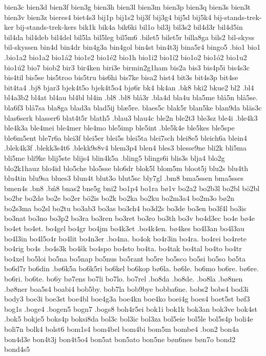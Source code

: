 bien3c
bien3d
bien3f
bien3g
bien3h
bien3l
bien3m
bien3p
bien3q
bien3s
bien3t
bien3v
bien3z
bieres4
biet4s3
bij1p
bij1s2
bij3f
bij3g4
bij5d
bij5k4
bij-stands-trek-ker
bij-stands-trek-kers
bik1k
bik4a
bik6ki
bil1o
bil3j
bil3s2
bil4d3r
bil4d5in
bil4da
bil4deb
bil4del
bil5la
bil5leg
bil5m6
.bilet5
bilet5r
billa8ga
bils2
bil-skyss
bil-skyssen
bin4d
bin4dr
bin4g3a
bin4gol
bin4st
bin4t3j
bina5r4
bingo5
.bio1
bio1
.bio1a2
bio1a2
bio1á2
bio1e2
bio1é2
bio1h
bio1i2
bio1í2
bio1o2
bio1ó2
bio1u2
bio1ú2
bio7
biob2
bir3
bir4ken
biri3e
birmin2g1ham
bis2a
bis3
bis4p5i
bis4s3c
bis4til
bis5se
bis5troo
bis5tru
bis6hi
bis7ke
bisa2
bist4
bit3s
bit4s3p
bit4se
bit4ta4
.bj8
bjar3
bjek4t5o
bjek4t5o4
bjø6r
bk4
bk4an
.bk8
bki2
bkue2
bl2
.bl4
bl4a3b2
bl4at
bl4au
bl4bl
bl4in
.bl8
.bł8
blå3r
.bla4d
bla4u
bla5me
blå5n
blå5se.
bla6f3
blå7sa
bla8ga
blad3a
blad5ij
blæ5re.
blaes5c
blak5r
blan5ke
blan9da
bläs3c
blas6serk
blasser6
blat4t5r
blath5
.blau3
blau4c
ble2n
ble2t3
ble3sz
ble4i
.ble4k3
ble4k3a
ble4mei
ble4mer
ble4mo
ble5imp
ble5int
.ble5k4e
ble5kes
ble5spe
ble6m5ent
ble7r6a
blei3f
blei5er
blei5s
blei5ta
blei7sch
blei8e5
bleich6a
blein4
.blek4k3f
.blekk3s4t6
.blekk9s8v4
blem3p4
blen4
bles3
blesse9ne
bli2k
bli5ma
bli5me
bli9ke
blij5ste
blijs4
blin4k5a
.bling5
blings6i
blis3s
blja4
blo2g
blo2k1hauz
blo4id
blo5che
blo5sse
blo6dr
blok5l
blom5m
bloot5j
blu2s
blu4th
blu4tin
blu9sa
blues3
blun4t
blut3o
blut5sc
bly7gl
.bm8
bma5ssen
bma5sses
bmen4s
.bn8
.bń8
bnas2
bne5g
bni2
bo1p4
bo1ra
bø1v
bo2a2
bo2b3l
bo2bl
bö2bl
bo2br
bo2dø
bo2e
bo2er
bö2is
bo2k
bo2ka
bo2ku
bo2m3a4
bo2m3o
bø2n
bo2s3ma
bo2sl
bo2tu
bo3ab3
bo3as
bo3ch4
bo3d2s
bo3de
bo3en
bo3f4l
bo3is
bo3nat
bo3no
bo3p2
bo3ra
bo3ren
bo3ret
bo3ro
bo3th
bo3v
bo4d3ec
bo4e
bø4e
bo4et
bo4et.
bo4gel
bo4gr
bo4jm
bo4k3et
.bo4k4en.
bø4kes
bo4l3an
bo4l3au
bo4l3in
bo4l5o4r
bo4lit
bo4n3er
.bo4na.
bo4ok
bo4r3in
bo4ra.
bo4rei
bo4rete
bo4rig
bo4s
.bo4s3k
bo4šk
bo4spo
bo4sto
bo4ta.
bo4tak
bo4tal
bo4to
bo4tr
bo4xel
bo5loi
bo5na
bo5nap
bo5nus
bo5rant
bo5re
bo5sco
bo5si
bo5so
bø5ta
bo6d7r
bo6din
.bø6k5a
bo6k5ri
bo6kel
bo6kop
bø6la.
bø6le.
bo6mo
bo6re.
bø6re.
bo6ri.
bo6te.
bo6y
bø7ens
bo7li
bo7lo.
bo7rel
.bo8da
.bo8de.
.bo8la
.bø8nen
.bø8ner
boa5s4
boabi4
bob5by.
bob7la
bob9bye
bobba6ne.
bobs2
bobs4
bod3i
body3
boe3i
boe3st
boe4bl
boe4g3a
boe4kn
boe4ko
boei4g
boes4
boet5st
bøf3
bog1s
.boge4
.bogen5
bogn7
.bogs8
boh4r5ei
bok1i
bok1k
bok3an
bok3ve
bok4st
.bok5
bokje5
boks4p
boksi8da
bol3c
bol3ic
bol3za
bol5eie
bol5le
bol5s4p
boli4e
boli7n
bolk4
bolst6
bom1s4
bom4bel
bom4bi
bom5m
bombe4
.bon2
bon4a
bon4d3e
bon4t3j
bon4t5o4
bon5at
bon5ato
bon5ne
bøn6nes
bøn7o
bond2
bond4s5
